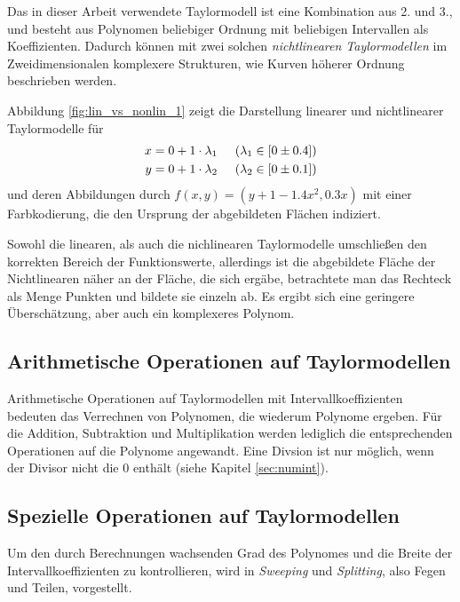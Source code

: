 Das in dieser Arbeit verwendete Taylormodell ist eine Kombination aus 2. und 3., und besteht aus Polynomen beliebiger Ordnung mit beliebigen Intervallen als Koeffizienten. Dadurch können mit zwei solchen \textit{nichtlinearen Taylormodellen} im Zweidimensionalen komplexere Strukturen, wie Kurven höherer Ordnung beschrieben werden.

Abbildung \ref{fig:lin_vs_nonlin_1} zeigt die Darstellung linearer und nichtlinearer Taylormodelle für
\begin{align*}
x = 0 + 1 \cdot \lambda_1 & \hspace{0.5cm} (\lambda_1 \in [0 \pm 0.4]) \\
 y = 0 + 1 \cdot \lambda_2 & \hspace{0.5cm} (\lambda_2 \in [0 \pm 0.1])
\end{align*}
und deren Abbildungen durch $f(x,y) = (y + 1- 1.4 x^2,0.3x)$ mit einer Farbkodierung, die den Ursprung der abgebildeten Flächen indiziert.


Sowohl die linearen, als auch die nichlinearen Taylormodelle umschließen den korrekten Bereich der Funktionswerte, allerdings ist die abgebildete Fläche der Nichtlinearen näher an der Fläche, die sich ergäbe, betrachtete man das Rechteck als Menge Punkten und bildete sie einzeln ab. Es ergibt sich eine geringere Überschätzung, aber auch ein komplexeres Polynom.


\subsection{Arithmetische Operationen auf Taylormodellen}

Arithmetische Operationen auf Taylormodellen mit Intervallkoeffizienten bedeuten das Verrechnen von Polynomen, die wiederum Polynome ergeben. Für die Addition, Subtraktion und Multiplikation werden lediglich die entsprechenden Operationen auf die Polynome angewandt. Eine Divsion ist nur möglich, wenn der Divisor nicht die 0 enthält (siehe Kapitel \ref{sec:numint}).




    \subsection{Spezielle Operationen auf Taylormodellen}
Um den durch Berechnungen wachsenden Grad des Polynomes und die Breite der Intervallkoeffizienten zu kontrollieren, wird in \cite{DBLP:conf/macis/BrausseKM15} \textit{Sweeping} und \textit{Splitting}, also Fegen und Teilen, vorgestellt. 

